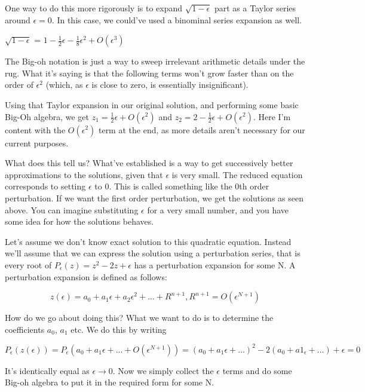 \documentclass[12pt]{report}
\begin{document}
One way to do this more rigorously is to expand $\sqrt{1-\epsilon}$ part as a
Taylor series around $\epsilon = 0$. In this case, we could've used a binominal series expansion as
well.

$\sqrt{1 - \epsilon}$ = $1 - \frac 1 2 \epsilon - \frac 1 8 \epsilon^2 +
O(\epsilon^3)$

The Big-oh notation is just a way to sweep irrelevant arithmetic details under
the rug. What it's saying is that the following terms won't grow faster than on
the order of $\epsilon^2$ (which, as $\epsilon$ is close to zero, is essentially
insignificant).

Using that Taylor expansion in our original solution, and performing some basic
Big-Oh algebra, we get $z_1 = \frac 1 2 \epsilon + O(\epsilon^2)$ and $z_2 = 2 -
\frac 1 2 \epsilon + O(\epsilon^2)$. Here I'm content with the $O(\epsilon^2)$
term at the end, as more details aren't necessary for our current purposes.

What does this tell us? What've established is a way to get successively better
approximations to the solutions, given that $\epsilon$ is very small. The
reduced equation corresponds to setting $\epsilon$ to $0$. This is called
something like the 0th order perturbation. If we want the first order
perturbation, we get the solutions as seen above. You can imagine
substituting $\epsilon$ for a very small number, and you have some idea for how
the solutions behaves.

Let's assume we don't know exact solution to this quadratic equation. Instead
we'll assume that we can express the solution using a perturbation series, that
is every root of $P_\epsilon(z) = z^2 - 2z + \epsilon$ has a perturbation
expansion for some N. A perturbation expansion is defined as follows:

\begin{equation}
  z(\epsilon) = a_0 + a_1 \epsilon + a_2 \epsilon^2 + ...  + R^{n+1}, R^{n+1} = O(\epsilon^{N+1})
\end{equation}

How do we go about doing this? What we want to do is to determine the
coefficients $a_0$, $a_1$ etc. We do this by writing

$$P_\epsilon(z(\epsilon)) = P_\epsilon(a_0 + a_1\epsilon + ... +
O(\epsilon^{N+1})) = (a_0 + a_1\epsilon + ...)^2 - 2(a_0 + a1_\epsilon + ...) +
\epsilon = 0$$

It's identically equal as $\epsilon \to 0$. Now we simply
collect the $\epsilon$ terms and do some Big-oh algebra to put it in the
required form for some N.
\end{document}
